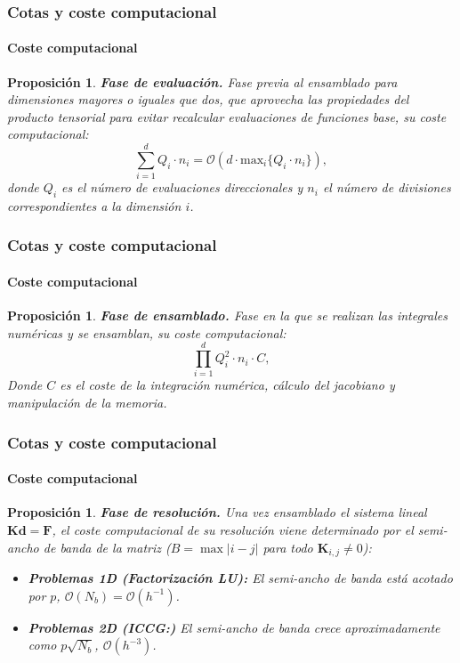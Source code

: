 \documentclass[compress]{beamer}
\newtheorem{proposition}[theorem]{Proposición}
\begin{document}
\begin{frame}
	\frametitle{Cotas y coste computacional}
	\framesubtitle{Coste computacional}

	\begin{proposition} \textbf{Fase de evaluación.}
		Fase previa al ensamblado para dimensiones mayores o iguales que dos, que aprovecha las propiedades del producto tensorial para evitar recalcular evaluaciones de funciones base, su coste computacional:
		{\setlength{\abovedisplayskip}{2pt}
		\setlength{\belowdisplayskip}{2pt}
		$$\sum_{i=1}^{d}Q_i\cdot n_i=\mathcal{O}(d\cdot\text{max}_i\{Q_i\cdot n_i\}),$$ donde $Q_i$ es el número de evaluaciones direccionales y $n_i$ el número de divisiones correspondientes a la dimensión $i$.
		}
	\end{proposition}
\end{frame}
\begin{frame}
	\frametitle{Cotas y coste computacional}
		\framesubtitle{Coste computacional}
	\begin{proposition} \textbf{Fase de ensamblado.}
		Fase en la que se realizan las integrales numéricas y se ensamblan, su coste computacional:
		{\setlength{\abovedisplayskip}{2pt}
		\setlength{\belowdisplayskip}{2pt}
		\begin{equation*}
			\prod_{i=1}^d Q_i^2 \cdot n_i \cdot C, 
		\end{equation*}
		}
		Donde $C$ es el coste de la integración numérica, cálculo del jacobiano y manipulación de la memoria.

	\end{proposition}
\end{frame}
\begin{frame}
	\frametitle{Cotas y coste computacional}
		\framesubtitle{Coste computacional}
	\begin{proposition} \textbf{Fase de resolución.}
		Una vez ensamblado el sistema lineal $\mathbf{K}\mathbf{d} = \mathbf{F}$, el coste computacional de su resolución viene determinado por el semi-ancho de banda de la matriz ($B = \max |i-j|$ para todo $\mathbf{K}_{i,j} \neq 0$):
    \begin{itemize}
        \item \textbf{Problemas 1D (Factorización LU):} El semi-ancho de banda está acotado por $p$, $\mathcal{O}(N_b)=\mathcal{O}(h^{-1})$.
        
        \item \textbf{Problemas 2D (ICCG:)} El semi-ancho de banda crece aproximadamente como $p\sqrt{N_b}$, $\mathcal{O}(h^{-3})$.
    \end{itemize}
	\end{proposition}
\end{frame}
\end{document}
